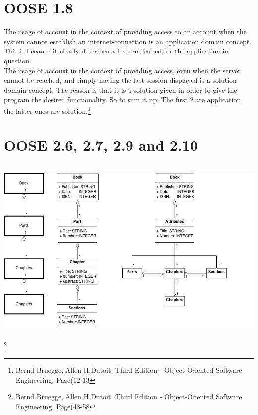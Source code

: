 \documentclass[12pt,a4paper]{article}
\begin{document}
\section{OOSE 1.8}
The usage of account in the context of providing access to an account when the system cannot establish an internet-connection is an application domain concept. This is because it clearly describes a feature desired for the application in question.\\
The usage of account in the context of providing access, even when the server cannot be reached, and simply having the last session displayed is a solution domain concept. The reason is that it is a solution given in order to give the program the desired functionality. So to sum it up: The first 2 are application, the latter ones are solution.\footnote{Bernd Bruegge, Allen H.Dutoit. Third Edition - Object-Oriented Software Engineering. Page(12-13}

\newpage

\section{OOSE 2.6, 2.7, 2.9 and 2.10}
\includegraphics[height=350px]{UntitledDiagram.jpg}
\footnote{Bernd Bruegge, Allen H.Dutoit. Third Edition - Object-Oriented Software Engineering. Page(48-58}

\newpage
\end{document}
